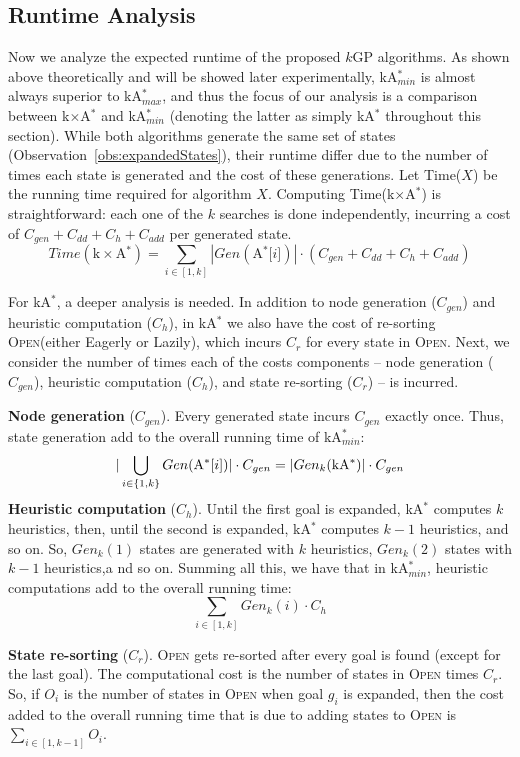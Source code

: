 \documentclass{aicom2e}
\newcommand{\kgs}{$k$GP}
\newcommand{\kastar}{kA$^*$}
\newcommand{\kastarmin}{kA$^*_{min}$}
\newcommand{\kastarmax}{kA$^*_{max}$}
\newcommand{\kxastar}{k$\times$A$^*$}
\newcommand{\astari}[1]{A$^*$[$#1$]}
\newcommand{\open}{\textsc{Open}}
\begin{document}
\subsection{Runtime Analysis}

Now we analyze the expected runtime of the proposed \kgs{} algorithms. As shown
above theoretically and will be showed later experimentally, \kastarmin{} is
almost always superior to \kastarmax{}, and thus the focus of our analysis is a
comparison between \kxastar{} and \kastarmin{} (denoting the latter as simply \kastar{} throughout this section).  While both algorithms generate
the same set of states (Observation~\ref{obs:expandedStates}), their runtime
differ due to the number of times each state is generated and the cost of these
generations. Let Time($X$) be the running time required for algorithm $X$.
Computing Time(\kxastar{}) is straightforward: each one of the $k$ searches is
done independently, incurring a cost of $C_{gen}+C_{dd}+C_h+C_{add}$ per
generated state.
\[
Time(\text{\kxastar{}}) = \sum_{i\in[1,k]} |Gen(\text{\astari{i}})|\cdot (C_{gen}+C_{dd}+C_h+C_{add})
\]

For \kastar{}, a deeper analysis is needed. In addition to node generation ($C_{gen}$) and heuristic computation ($C_h$), in \kastar{} we also have the cost of re-sorting \open (either Eagerly or Lazily), which incurs $C_r$ for every state in \open{}. 
Next, we consider the number of 
times each of the costs components -- node generation ($C_{gen}$), heuristic computation ($C_h$), and state re-sorting ($C_r$) -- is incurred.

{\bf Node generation} ($C_{gen}$). Every generated state incurs
$C_{gen}$ exactly once. Thus, state generation add to the overall running time of \kastarmin{}:
\[
|\bigcup_{i\in{\{1,k\}}} Gen(\text{\astari{i}})|\cdot C_{gen} =
|Gen_k(\text{\kastar{}})|\cdot C_{gen}  \displaystyle
\]
{\bf Heuristic computation} ($C_{h}$). 
Until the first goal is expanded, \kastar{} computes $k$ heuristics,
then, until the second is expanded, \kastar{} computes $k-1$ heuristics, and so on.
So, $Gen_k(1)$ states are generated with $k$ heuristics,
$Gen_{k}(2)$ states with $k-1$ heuristics,a nd so on. Summing all this, we have that
in \kastarmin{}, heuristic computations add to the overall running time:
\[ \sum_{i\in[1,k]} Gen_k(i)\cdot C_h \]


{\bf State re-sorting} ($C_r$). 
\open{} gets re-sorted after every goal is found (except for the last goal). 
The computational cost is the number of states in \open{} times $C_r$.
So, if $O_i$ is the number of states in \open{} when goal $g_i$ is expanded, then
the cost added to the overall running time that is due to adding states to \open{} is $\sum_{i\in[1,k-1]} O_i$. 
\end{document}
